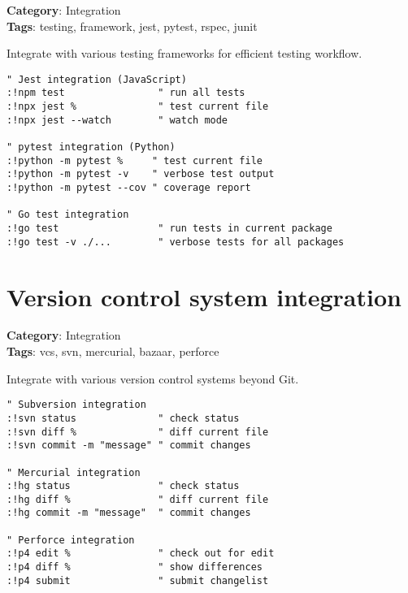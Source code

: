 {{{{{\textbf{Category}: Integration\\ \textbf{Tags}: testing, framework, jest, pytest, rspec, junit
\vspace{0.5cm}

Integrate with various testing frameworks for efficient testing workflow.

\begin{Exa*}{}
\begin{Verbatim}[fontsize=\footnotesize, breaklines, breakanywhere]
" Jest integration (JavaScript)
:!npm test                " run all tests
:!npx jest %              " test current file
:!npx jest --watch        " watch mode

" pytest integration (Python)
:!python -m pytest %     " test current file
:!python -m pytest -v    " verbose test output
:!python -m pytest --cov " coverage report

" Go test integration
:!go test                 " run tests in current package
:!go test -v ./...        " verbose tests for all packages
\end{Verbatim}
\end{Exa*}

\section{Version control system integration}

\textbf{Category}: Integration\\ \textbf{Tags}: vcs, svn, mercurial, bazaar, perforce
\vspace{0.5cm}

Integrate with various version control systems beyond Git.

\begin{Exa*}{}
\begin{Verbatim}[fontsize=\footnotesize, breaklines, breakanywhere]
" Subversion integration
:!svn status              " check status
:!svn diff %              " diff current file
:!svn commit -m "message" " commit changes

" Mercurial integration
:!hg status               " check status
:!hg diff %               " diff current file
:!hg commit -m "message"  " commit changes

" Perforce integration
:!p4 edit %               " check out for edit
:!p4 diff %               " show differences
:!p4 submit               " submit changelist
\end{Verbatim}
\end{Exa*}

}}}}}
